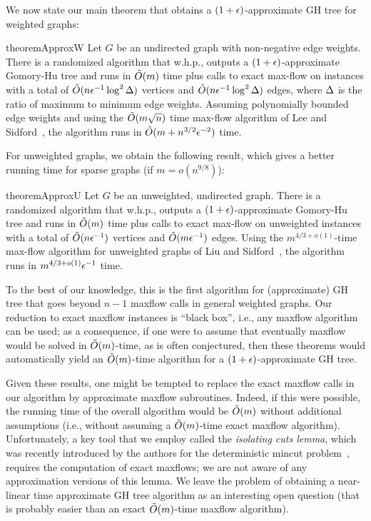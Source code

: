 We now state our main theorem that obtains a $(1+\epsilon)$-approximate GH tree for weighted graphs:
\begin{restatable}{theorem}{ApproxW}
    Let $G$ be an undirected graph with non-negative edge weights. There is a randomized algorithm that w.h.p., outputs a $(1+\epsilon)$-approximate Gomory-Hu tree and runs in $\tilde{O}(m)$ time plus calls to exact max-flow on instances with a total of $\tilde{O}(n\epsilon^{-1}\log^2\Delta)$ vertices and $\tilde{O}(n\epsilon^{-1}\log^2\Delta)$ edges, where $\Delta$ is the ratio of maximum to minimum edge weights. Assuming polynomially bounded edge weights and using the $\tilde{O}(m\sqrt{n})$ time max-flow algorithm of Lee and Sidford~\cite{LeeSflow}, the algorithm runs in $\tilde{O}(m + n^{3/2}\epsilon^{-2})$ time.
\end{restatable}
For unweighted graphs, we obtain the following result, which gives a better running time for sparse graphs (if $m = o(n^{9/8})$):
\begin{restatable}{theorem}{ApproxU}
Let $G$ be an unweighted, undirected graph. There is a randomized algorithm that w.h.p., outputs a $(1+\epsilon)$-approximate Gomory-Hu tree and runs in $\tilde{O}(m)$ time plus calls to exact max-flow on unweighted instances with a total of $\tilde{O}(n\epsilon^{-1})$ vertices and $\tilde{O}(m\epsilon^{-1})$ edges. Using the $m^{4/3+o(1)}$-time max-flow algorithm for unweighted graphs of Liu and Sidford~\cite{liu2020faster}, the algorithm runs in $m^{4/3+o(1)}\epsilon^{-1}$ time.
\end{restatable}

To the best of our knowledge, this is the first algorithm for (approximate) GH tree that goes beyond $n-1$ maxflow calls in general weighted graphs. Our reduction to exact maxflow instances is ``black box'', i.e., any maxflow algorithm can be used; as a consequence, if one were to assume that eventually maxflow would be solved in $\tilde{O}(m)$-time, as is often conjectured, then these theorems would automatically yield an $\tilde{O}(m)$-time algorithm for a $(1+\epsilon)$-approximate GH tree.

Given these results, one might be tempted to replace the exact maxflow calls in our algorithm by approximate maxflow subroutines. Indeed, if this were possible, the running time of the overall algorithm would be $\tilde{O}(m)$ without additional assumptions (i.e., without assuming a $\tilde{O}(m)$-time exact maxflow algorithm). Unfortunately, a key tool that we employ called the {\em isolating cuts lemma}, which was recently introduced by the authors for the deterministic mincut problem~\cite{LiP20}, requires the computation of exact maxflows; we are not aware of any approximation versions of this lemma. We leave the problem of obtaining a near-linear time approximate GH tree algorithm as an interesting open question (that is probably easier than an exact $\tilde{O}(m)$-time maxflow algorithm).


